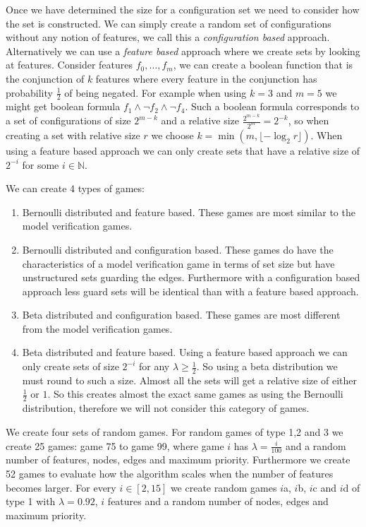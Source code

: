 Once we have determined the size for a configuration set we need to consider how the set is constructed. We can simply create a random set of configurations without any notion of features, we call this a \textit{configuration based} approach. Alternatively we can use a \textit{feature based} approach where we create sets by looking at features. Consider features $f_0, \dots, f_m$, we can create a boolean function that is the conjunction of $k$ features where every feature in the conjunction has probability $\frac{1}{2}$ of being negated.  For example when using $k=3$ and $m=5$ we might get boolean formula $f_1 \wedge \neg f_2 \wedge \neg f_4$. Such a boolean formula corresponds to a set of configurations of size $2^{m-k}$ and a relative size $\frac{2^{m-k}}{2^m} = 2^{-k}$, so when creating a set with relative size $r$ we choose $k = \min(m, \lfloor -\log_2{r} \rfloor)$. When using a feature based approach we can only create sets that have a relative size of $2^{-i}$ for some $i \in \mathbb{N}$.

We can create 4 types of games:
\begin{enumerate}
	\item Bernoulli distributed and feature based. These games are most similar to the model verification games.
	\item Bernoulli distributed and configuration based. These games do have the characteristics of a model verification game in terms of set size but have unstructured sets guarding the edges. Furthermore with a configuration based approach less guard sets will be identical than with a feature based approach.
	\item Beta distributed and configuration based. These games are most different from the model verification games.
	\item Beta distributed and feature based. Using a feature based approach we can only create sets of size $2^{-i}$ for any $\lambda \geq \frac{1}{2}$. So using a beta distribution we must round to such a size. Almost all the sets will get a relative size of either $\frac{1}{2}$ or $1$. So  this creates almost the exact same games as using the Bernoulli distribution, therefore we will not consider this category of games.
\end{enumerate}

We create four sets of random games. For random games of type 1,2 and 3 we create 25 games: game 75 to game 99, where game $i$ has $\lambda=\frac{i}{100}$ and a random number of features, nodes, edges and maximum priority. Furthermore we create 52 games to evaluate how the algorithm scales when the number of features becomes larger. For every $i \in [2,15]$ we create random games $i$a, $i$b, $i$c and $i$d of type 1 with $\lambda=0.92$, $i$ features and a random number of nodes, edges and maximum priority. 

